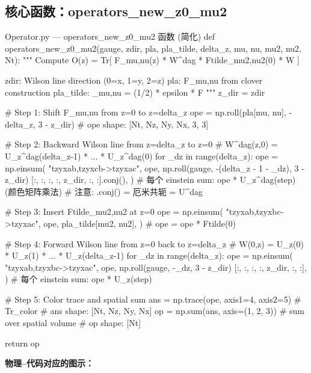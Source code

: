 \documentclass[12pt,a4paper]{ctexart}
\begin{document}
\subsection{核心函数：operators\_new\_z0\_mu2}

\begin{codeblock}{Operator.py --- operators\_new\_z0\_mu2 函数 (简化)}
def operators_new_z0_mu2(gauge, zdir, pla, pla_tilde,
                          delta_z, mu, nu, mu2, nu2, Nt):
    """
    Compute O(z) = Tr[ F_{mu,nu}(z) * W^dag * Ftilde_{mu2,nu2}(0) * W ]

    zdir: Wilson line direction (0=x, 1=y, 2=z)
    pla:  F_{mu,nu} from clover construction
    pla_tilde: _{mu,nu} = (1/2) * epsilon * F
    """
    z_dir = zdir

    # Step 1: Shift F_{mu,nu} from z=0 to z=delta_z
    ope = np.roll(pla[mu, nu], -delta_z, 3 - z_dir)
    # ope shape: [Nt, Nz, Ny, Nx, 3, 3]

    # Step 2: Backward Wilson line from z=delta_z to z=0
    #    W^dag(z,0) = U_z^dag(delta_z-1) * ... * U_z^dag(0)
    for _dz in range(delta_z):
        ope = np.einsum(
            "tzyxab,tzyxcb->tzyxac",
            ope,
            np.roll(gauge, -(delta_z - 1 - _dz), 3 - z_dir)
              [:, :, :, :, z_dir, :, :].conj(),
        )
    # 每个 einstein sum: ope * U_z^dag(step)  (颜色矩阵乘法)
    # 注意: .conj() = 厄米共轭 = U^dag

    # Step 3: Insert Ftilde_{mu2,nu2} at z=0
    ope = np.einsum(
        "tzyxab,tzyxbc->tzyxac",
        ope,
        pla_tilde[mu2, nu2],
    )
    # ope = ope * Ftilde(0)

    # Step 4: Forward Wilson line from z=0 back to z=delta_z
    #    W(0,z) = U_z(0) * U_z(1) * ... * U_z(delta_z-1)
    for _dz in range(delta_z):
        ope = np.einsum(
            "tzyxab,tzyxbc->tzyxac",
            ope,
            np.roll(gauge, -_dz, 3 - z_dir)
              [:, :, :, :, z_dir, :, :],
        )
    # 每个 einstein sum: ope * U_z(step)

    # Step 5: Color trace and spatial sum
    ans = np.trace(ope, axis1=4, axis2=5)  # Tr_color
    # ans shape: [Nt, Nz, Ny, Nx]
    op = np.sum(ans, axis=(1, 2, 3))       # sum over spatial volume
    # op shape: [Nt]

    return op
\end{codeblock}

\textbf{物理--代码对应的图示：}
\end{document}
